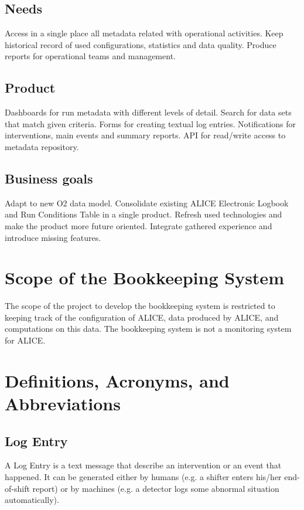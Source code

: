 \subsection{Needs}
Access in a single place all metadata related with operational activities. Keep historical record of used configurations, statistics and data quality. Produce reports for operational teams and management. 

\subsection{Product}
Dashboards for run metadata with different levels of detail. Search for data sets that match given criteria. Forms for creating textual log entries. Notifications for interventions, main events and summary reports. API for read/write access to metadata repository. 


\subsection{Business goals}
Adapt to new O2 data model. Consolidate existing ALICE Electronic Logbook and Run Conditions Table in a single product. Refresh used technologies and make the product more future oriented. Integrate gathered experience and introduce missing features. 



\section{Scope of the Bookkeeping System}
The scope of the project to develop the bookkeeping system is restricted to keeping track of the configuration of ALICE, data produced by ALICE, and computations on this data. The bookkeeping system is not a monitoring system for ALICE.

\section{Definitions, Acronyms, and Abbreviations}

\subsection{Log Entry}
A Log Entry is a text message that describe an intervention or an event that happened. It can be generated either by humans (e.g. a shifter enters his/her end-of-shift report) or by machines (e.g. a detector logs some abnormal situation automatically). 

